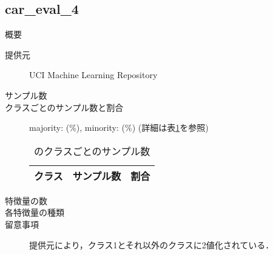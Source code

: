 \subsection{car\_eval\_4}
\begin{description}
    \item[概要] \cite{}
    \item[提供元] UCI Machine Learning Repository
    \item[サンプル数] 
    \item[クラスごとのサンプル数と割合] majority:  (\%), minority:  (\%) (詳細は表\ref{tab:}を参照)

        \begin{table}
            \centering
            \caption{のクラスごとのサンプル数}
            \label{tab:}
            \begin{tabular}{lrc} \hline
                \multicolumn{1}{c}{クラス}&
                \multicolumn{1}{c}{サンプル数}&
                \multicolumn{1}{c}{割合}\\
                \hline
                \hline

                \hline
            \end{tabular}
        \end{table}

    \item[特徴量の数] 
    \item[各特徴量の種類] \mbox{}
        
    \item[留意事項] 提供元により，クラス1とそれ以外のクラスに2値化されている．
\end{description}

